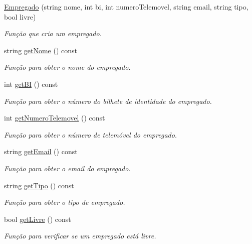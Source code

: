 \begin{DoxyCompactItemize}
\item 
\hyperlink{class_empregado_ae640622b26d350c85d75f315a4e08e3b}{Empregado} (string nome, int bi, int numero\+Telemovel, string email, string tipo, bool livre)
\begin{DoxyCompactList}\small\item\em Função que cria um empregado. \end{DoxyCompactList}\item 
string \hyperlink{class_empregado_a3b7e1e37085dc3233372303dc5fad063}{get\+Nome} () const 
\begin{DoxyCompactList}\small\item\em Função para obter o nome do empregado. \end{DoxyCompactList}\item 
int \hyperlink{class_empregado_af53f765432478ff43995d6373820a610}{get\+BI} () const 
\begin{DoxyCompactList}\small\item\em Função para obter o número do bilhete de identidade do empregado. \end{DoxyCompactList}\item 
int \hyperlink{class_empregado_a3b02866760b1bbaf73e6bffd58be8707}{get\+Numero\+Telemovel} () const 
\begin{DoxyCompactList}\small\item\em Função para obter o número de telemóvel do empregado. \end{DoxyCompactList}\item 
string \hyperlink{class_empregado_aae81874e92f153d53ab930da428ab6a6}{get\+Email} () const 
\begin{DoxyCompactList}\small\item\em Função para obter o email do empregado. \end{DoxyCompactList}\item 
string \hyperlink{class_empregado_a31668a30674046ed45b1543de5948b39}{get\+Tipo} () const 
\begin{DoxyCompactList}\small\item\em Função para obter o tipo de empregado. \end{DoxyCompactList}\item 
bool \hyperlink{class_empregado_a79d9a4467c7c506f26f178fe94f3084d}{get\+Livre} () const 
\begin{DoxyCompactList}\small\item\em Função para verificar se um empregado está livre. \end{DoxyCompactList}\item 

\end{DoxyCompactItemize}
